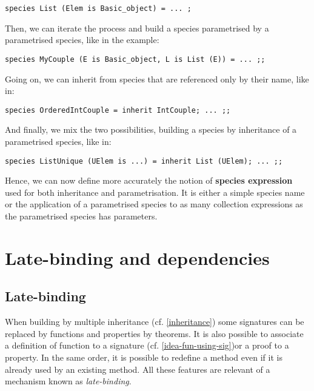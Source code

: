 {\scriptsize
\begin{lstlisting}
species List (Elem is Basic_object) = ... ;
\end{lstlisting}}

Then, we can iterate the process and build
a species parametrised by a parametrised species, like in the example:

{\scriptsize
\begin{lstlisting}
species MyCouple (E is Basic_object, L is List (E)) = ... ;;
\end{lstlisting}}

Going on, we can  inherit
from species that are referenced only by their name, like in:

{\scriptsize
\begin{lstlisting}
species OrderedIntCouple = inherit IntCouple; ... ;;
\end{lstlisting}}

And finally, we mix the two possibilities, building a species by
inheritance of a parametrised species, like in:

{\scriptsize
\begin{lstlisting}
species ListUnique (UElem is ...) = inherit List (UElem); ... ;;
\end{lstlisting}}

Hence, we can now define more accurately the notion of {\bf species
expression} used for both inheritance and parametrisation. It is either
a simple species name or the application of a parametrised species to
as many collection expressions as the parametrised species has
parameters.


\section{Late-binding and dependencies}

\subsection{Late-binding}
\label{late-binding}
 When building by multiple inheritance
(cf. \ref{inheritance}) some signatures can be replaced by functions
and properties by theorems. It is also possible to associate a
definition of function to a signature (cf. \ref{idea-fun-using-sig})or
a proof to a property. In the same order, it is possible to redefine a
method even if it is  already used by an existing method.
All these features are relevant of a mechanism known as {\em late-binding}.


